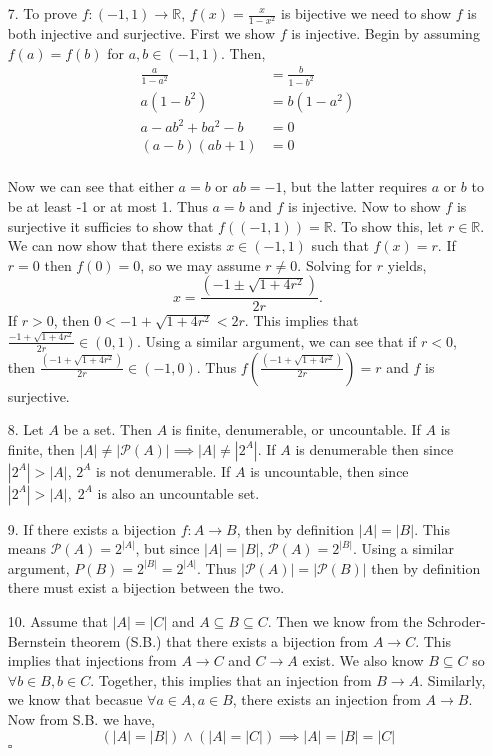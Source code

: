 \documentclass[12pt]{article}
\newcommand{\R}{\mathbb{R}}
\newcommand{\pow}[1]{ \mathcal{P}\left(#1\right) }
\begin{document}
\begin{enumerate}
    \item[7. ]To prove $f:(-1,1)\rightarrow \R$, $f(x)=\frac{x}{1-x^2}$ is bijective we need to show $f$ is both injective and surjective. First we show $f$ is injective. Begin by assuming $f(a)=f(b)$ for $a,b\in(-1,1)$. Then,
    \begin{align*}
        \frac{a}{1-a^2} &=\frac{b}{1-b^2} \\ 
        a(1-b^2) &= b(1-a^2) \\
        a-ab^2+ ba^2-b   &= 0 \\ 
        (a-b)(ab+1) &= 0 \\
    \end{align*}
    
    Now we can see that either $a=b$ or $ab=-1$, but the latter requires $a$ or $b$ to be at least -1 or at most 1. Thus $a=b$ and $f$ is injective. Now to show $f$ is surjective it sufficies to show that $f((-1,1))=\R$. To show this, let $ r\in\R$. We can now show that there exists $x\in(-1,1)$ such that $f(x)=r$. If $r=0$ then $f(0)=0$, so we may assume $r\neq 0$. Solving for $r$ yields,
    $$ x =\frac{(−1\pm\sqrt{1+4r^2})}{2r}. $$
    If $r>0$, then $0<-1+\sqrt{1+4r^2}<2r$. This implies that $\frac{-1+\sqrt{1+4r^2}}{2r}\in(0,1).$ Using a similar argument, we can see that if $r<0$, then $\frac{(−1+ \sqrt{1+4r^2})}{2r}\in (-1,0)$. Thus $f(\frac{(−1+ \sqrt{1+4r^2})}{2r})=r$ and $f$ is surjective.
    
    \item[8. ]Let $A$ be a set. Then $A$ is finite, denumerable, or uncountable. If $A$ is finite, then $|A|\neq|\pow{A}|\implies|A|\neq|2^{A}|$. If $A$ is denumerable then since $|2^A|>|A|$, $2^A$ is not denumerable. If $A$ is uncountable, then since $|2^A| > |A|,\;2^A$ is also an uncountable set.
    
    \item[9. ]If there exists a bijection $f:A\rightarrow B$, then by definition $|A| = |B|$. This means $\pow{A}=2^{|A|}$, but since $|A| = |B|$, $\pow{A}=2^{|B|}$. Using a similar argument, $P(B)=2^{|B|}=2^{|A|}$. Thus $|\pow{A}|=|\pow{B}|$ then by definition there must exist a bijection between the two.
    
    \item[10. ]Assume that $|A|=|C|$ and $A\subseteq B\subseteq C$. Then we know from the Schroder-Bernstein theorem (S.B.) that there exists a bijection from $A\rightarrow C$. This implies that injections from $A\rightarrow C$ and $C\rightarrow A$ exist. We also know $B\subseteq C$ so $\forall b\in B, b\in C$. Together, this implies that an injection from $B\rightarrow A$. Similarly, we know that becasue $\forall a\in A, a\in B$, there exists an injection from $A\rightarrow B$. Now from S.B. we have,
    $$ (|A|=|B|) \land (|A|=|C|) \implies |A|=|B|=|C| $$
    $\square$

    
 
 \end{enumerate}
 
\end{document}
